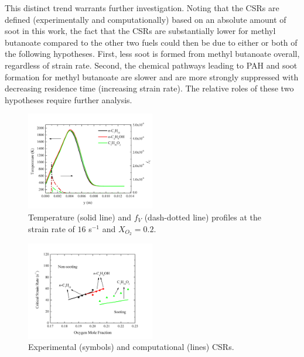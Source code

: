 \documentclass[review,3p,times]{elsarticleUS}
\begin{document}
This distinct trend warrants further investigation.  Noting that the CSRs are defined (experimentally and computationally) based on an absolute amount of soot in this work, the fact that the CSRs are substantially lower for methyl butanoate compared to the other two fuels could then be due to either or both of the following hypotheses.  First, less soot is formed from methyl butanoate overall, regardless of strain rate.  Second, the chemical pathways leading to PAH and soot formation for methyl butanoate are slower and are more strongly suppressed with decreasing residence time (increasing strain rate).  The relative roles of these two hypotheses require further analysis.

\begin{figure}[t]
  \centering
  \scriptsize
  \vspace{-0.1in}
  \includegraphics[trim=4mm 8mm 4mm 20mm, clip=true, width=0.5\textwidth]{Thermal.png}
  \normalsize
  \vspace{-0.1in}
  \caption{Temperature (solid line) and $f_V$ (dash-dotted line) profiles at the strain rate of $16$ s$^{-1}$ and $X_{O_2}=0.2$.}
  \label{fig:thermal}
\end{figure}


\begin{figure}[t]
  \centering
  \scriptsize
  \vspace{0.5in}
  \includegraphics[trim=4mm 8mm 30mm 20mm, clip=true, width=0.5\textwidth]{Exp-Comp.png}
  \normalsize
  \vspace{-0.1in}
  \caption{Experimental (symbols) and computational (lines) CSRs.}
  \label{fig:Exp-Comp}
\end{figure}
\end{document}
